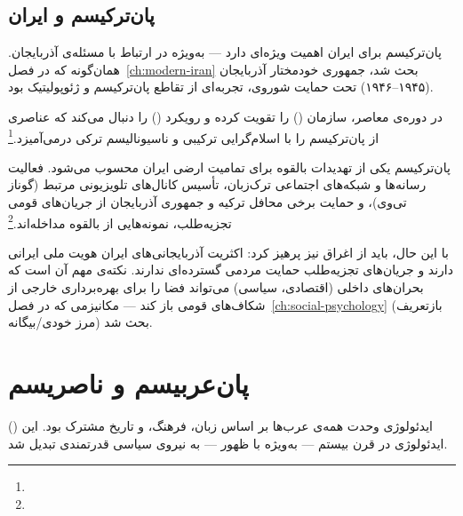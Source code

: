 \subsection{پان‌ترکیسم و ایران}
\label{subsec:ch13-panturkism-iran}

پان‌ترکیسم برای ایران اهمیت ویژه‌ای دارد — به‌ویژه در ارتباط با مسئله‌ی آذربایجان. همان‌گونه که در فصل~\ref{ch:modern-iran} بحث شد، جمهوری خودمختار آذربایجان (۱۹۴۵–۱۹۴۶) تحت حمایت شوروی، تجربه‌ای از تقاطع پان‌ترکیسم و ژئوپولیتیک بود.

در دوره‌ی معاصر،  سازمان  () را تقویت کرده و رویکرد  () را دنبال می‌کند که عناصری از پان‌ترکیسم را با اسلام‌گرایی ترکیبی و ناسیونالیسم ترکی درمی‌آمیزد.\footnote{}

\begin{tcolorbox}[enemybox, title={هشدار: پان‌ترکیسم و تمامیت ارضی ایران}]
پان‌ترکیسم یکی از تهدیدات بالقوه برای تمامیت ارضی ایران محسوب می‌شود. فعالیت رسانه‌ها و شبکه‌های اجتماعی ترک‌زبان، تأسیس کانال‌های تلویزیونی مرتبط (گوناز تی‌وی)، و حمایت برخی محافل ترکیه و جمهوری آذربایجان از جریان‌های قومی تجزیه‌طلب، نمونه‌هایی از  بالقوه مداخله‌اند.\footnote{}

با این حال، باید از اغراق نیز پرهیز کرد: اکثریت آذربایجانی‌های ایران هویت ملی ایرانی دارند و جریان‌های تجزیه‌طلب حمایت مردمی گسترده‌ای ندارند. نکته‌ی مهم آن است که بحران‌های داخلی (اقتصادی، سیاسی) می‌تواند فضا را برای بهره‌برداری خارجی از شکاف‌های قومی باز کند — مکانیزمی که در فصل~\ref{ch:social-psychology} (بازتعریف مرز خودی/بیگانه) بحث شد.
\end{tcolorbox}


\section{پان‌عربیسم و ناصریسم}
\label{sec:ch13-panarabism}

 () ایدئولوژی وحدت همه‌ی عرب‌ها بر اساس زبان، فرهنگ، و تاریخ مشترک بود. این ایدئولوژی در قرن بیستم — به‌ویژه با ظهور  — به نیروی سیاسی قدرتمندی تبدیل شد.

